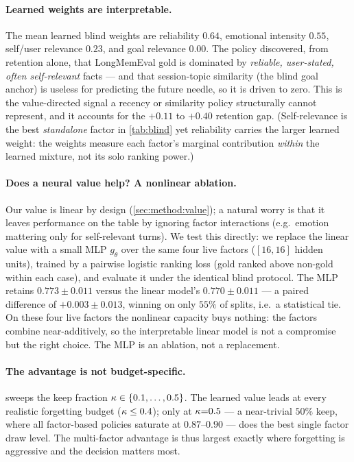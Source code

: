 \paragraph{Learned weights are interpretable.}
The mean learned blind weights are reliability $0.64$, emotional
intensity $0.55$, self/user relevance $0.23$, and goal relevance $0.00$.
The policy discovered, from retention alone, that LongMemEval gold is
dominated by \emph{reliable, user-stated, often self-relevant} facts ---
and that session-topic similarity (the blind goal anchor) is useless for
predicting the future needle, so it is driven to zero. This is the
value-directed signal a recency or similarity policy structurally cannot
represent, and it accounts for the $+0.11$ to $+0.40$ retention gap.
(Self-relevance is the best \emph{standalone} factor in \cref{tab:blind}
yet reliability carries the larger learned weight: the weights measure
each factor's marginal contribution \emph{within} the learned mixture, not
its solo ranking power.)

\paragraph{Does a neural value help? A nonlinear ablation.}
Our value is linear by design (\cref{sec:method:value}); a natural worry
is that it leaves performance on the table by ignoring factor
interactions (e.g.\ emotion mattering only for self-relevant turns). We
test this directly: we replace the linear value with a small MLP
$g_\theta$ over the same four live factors ($[16,16]$ hidden units),
trained by a pairwise logistic ranking loss (gold ranked above non-gold
within each case), and evaluate it under the identical blind protocol.
The MLP retains $0.773\pm0.011$ versus the linear model's
$0.770\pm0.011$ --- a paired difference of $+0.003\pm0.013$, winning on
only $55\%$ of splits, i.e.\ a statistical tie. On these four live factors
the nonlinear capacity buys nothing: the factors combine near-additively,
so the interpretable linear model is not a compromise but the right choice.
The MLP is an ablation, not a replacement.

\paragraph{The advantage is not budget-specific.}
 sweeps the keep fraction $\kappa \in
\{0.1,\dots,0.5\}$. The learned value leads at every realistic forgetting
budget ($\kappa \le 0.4$); only at $\kappa{=}0.5$ --- a near-trivial
$50\%$ keep, where all factor-based policies saturate at $0.87$--$0.90$
--- does the best single factor draw level. The multi-factor advantage is
thus largest exactly where forgetting is aggressive and the decision
matters most.

